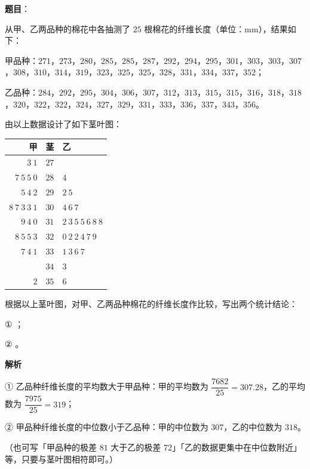 \begin{answer}

\textbf{题目}：

从甲、乙两品种的棉花中各抽测了 $25$ 根棉花的纤维长度（单位：mm），结果如下：

甲品种：$271$，$273$，$280$，$285$，$285$，$287$，$292$，$294$，$295$，$301$，$303$，$303$，$307$，$308$，$310$，$314$，$319$，$323$，$325$，$325$，$328$，$331$，$334$，$337$，$352$；

乙品种：$284$，$292$，$295$，$304$，$306$，$307$，$312$，$313$，$315$，$315$，$316$，$318$，$318$，$320$，$322$，$322$，$324$，$327$，$329$，$331$，$333$，$336$，$337$，$343$，$356$。

由以上数据设计了如下茎叶图：

\begin{center}
\begin{tabular}{rcl}
\toprule
甲 & 茎 & 乙 \\
\midrule
$3\ 1$ & $27$ &  \\
$7\ 5\ 5\ 0$ & $28$ & $4$ \\
$5\ 4\ 2$ & $29$ & $2\ 5$ \\
$8\ 7\ 3\ 3\ 1$ & $30$ & $4\ 6\ 7$ \\
$9\ 4\ 0$ & $31$ & $2\ 3\ 5\ 5\ 6\ 8\ 8$ \\
$8\ 5\ 5\ 3$ & $32$ & $0\ 2\ 2\ 4\ 7\ 9$ \\
$7\ 4\ 1$ & $33$ & $1\ 3\ 6\ 7$ \\
 & $34$ & $3$ \\
$2$ & $35$ & $6$ \\
\bottomrule
\end{tabular}
\end{center}

根据以上茎叶图，对甲、乙两品种棉花的纤维长度作比较，写出两个统计结论：

① \gkblank{}；

② \gkblank{}。

\textbf{解析}

① 乙品种纤维长度的平均数大于甲品种：甲的平均数为 $\dfrac{7682}{25}=307.28$，乙的平均数为 $\dfrac{7975}{25}=319$；

② 甲品种纤维长度的中位数小于乙品种：甲的中位数为 $307$，乙的中位数为 $318$。

（也可写「甲品种的极差 $81$ 大于乙的极差 $72$」「乙的数据更集中在中位数附近」等，只要与茎叶图相符即可。）


\end{answer}
